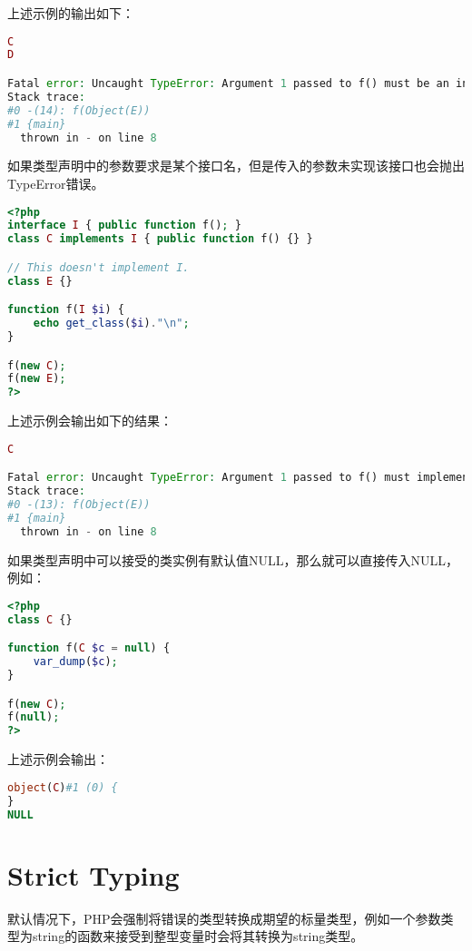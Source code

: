 上述示例的输出如下：


\begin{lstlisting}[language=PHP]
C
D

Fatal error: Uncaught TypeError: Argument 1 passed to f() must be an instance of C, instance of E given, called in - on line 14 and defined in -:8
Stack trace:
#0 -(14): f(Object(E))
#1 {main}
  thrown in - on line 8
\end{lstlisting}


如果类型声明中的参数要求是某个接口名，但是传入的参数未实现该接口也会抛出TypeError错误。


\begin{lstlisting}[language=PHP]
<?php
interface I { public function f(); }
class C implements I { public function f() {} }

// This doesn't implement I.
class E {}

function f(I $i) {
    echo get_class($i)."\n";
}

f(new C);
f(new E);
?>
\end{lstlisting}

上述示例会输出如下的结果：


\begin{lstlisting}[language=PHP]
C

Fatal error: Uncaught TypeError: Argument 1 passed to f() must implement interface I, instance of E given, called in - on line 13 and defined in -:8
Stack trace:
#0 -(13): f(Object(E))
#1 {main}
  thrown in - on line 8
\end{lstlisting}

如果类型声明中可以接受的类实例有默认值NULL，那么就可以直接传入NULL，例如：

\begin{lstlisting}[language=PHP]
<?php
class C {}

function f(C $c = null) {
    var_dump($c);
}

f(new C);
f(null);
?>
\end{lstlisting}

上述示例会输出：

\begin{lstlisting}[language=PHP]
object(C)#1 (0) {
}
NULL
\end{lstlisting}

\section{Strict Typing}


默认情况下，PHP会强制将错误的类型转换成期望的标量类型，例如一个参数类型为string的函数来接受到整型变量时会将其转换为string类型。

